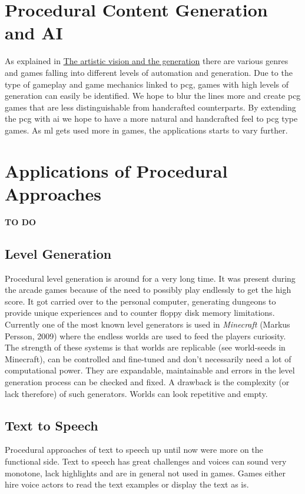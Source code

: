 \documentclass[10pt,a4paper]{article}
\begin{document}
\section{Procedural Content Generation and AI}
As explained in \hyperref[sec:visionVSgeneration]{The artistic vision and the generation} there are various genres and games falling into different levels of automation and generation. Due to the type of gameplay and game mechanics linked to \gls{pcg}, games with high levels of generation can easily be identified. We hope to blur the lines more and create \gls{pcg} games that are less distinguishable from handcrafted counterparts. By extending the \gls{pcg} with \gls{ai} we hope to have a more natural and handcrafted feel to \gls{pcg} type games. As \gls{ml} gets used more in games, the applications starts to vary further.

\section{Applications of Procedural Approaches}
\textbf{TO DO}

\subsection{Level Generation}
Procedural level generation is around for a very long time. It was present during the arcade games because of the need to possibly play endlessly to get the high score. It got carried over to the personal computer, generating dungeons to provide unique experiences\cite{VanderLinden2014} and to counter floppy disk memory limitations. Currently one of the most known level generators is used in \textit{Minecraft} (Markus Persson, 2009) where the endless worlds are used to feed the players curiosity. The strength of these systems is that worlds are replicable (see world-seeds in Minecraft), can be controlled and fine-tuned and don't necessarily need a lot of computational power. They are expandable, maintainable and errors in the level generation process can be checked and fixed. A drawback is the complexity (or lack therefore) of such generators. Worlds can look repetitive and empty.

\subsection{Text to Speech}
Procedural approaches of text to speech up until now were more on the functional side. Text to speech has great challenges and voices can sound very monotone, lack highlights and are in general not used in games. Games either hire voice actors to read the text examples or display the text as is.
\end{document}
